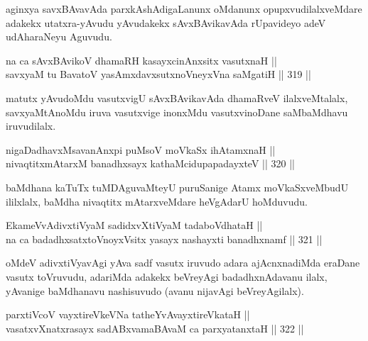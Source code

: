 \begin{artha}
aginxya savxBAvavAda parxkAshAdigaLanunx oMdanunx
opupxvudilalxveMdare adakekx utatxra-yAvudu yAvudakekx sAvxBAvikavAda
rUpavideyo adeV udAharaNeyu Aguvudu.
\end{artha}

\begin{shl}
na ca sAvxBAvikoV dhamaRH kasayxcinAnxsitx vasutxnaH || \\
savxyaM tu BavatoV yasAmxdavxsutxnoV\s neyxVna saMgatiH \hfill || 319 ||  
\end{shl}

\begin{artha}
matutx yAvudoMdu vasutxvigU sAvxBAvikavAda dhamaRveV ilalxveMtalalx,
savxyaMtAnoMdu iruva vasutxvige inonxMdu vasutxvinoDane saMbaMdhavu
iruvudilalx.
\end{artha}

\begin{shl}
nigaDadhavxMsavanAnxpi puMsoV moVkaSx ihA\s \s tamxnaH ||  \\
nivaqtitxmAtarxM banadhxsayx kathaMcidupapadayxteV \hfill || 320 ||  
\end{shl}

\begin{artha}
baMdhana kaTuTx tuMDAguvaMteyU puruSanige Atamx moVkaSxveMbudU
ililxlalx, baMdha nivaqtitx mAtarxveMdare heVgAdarU hoMduvudu.
\end{artha}

\begin{shl}
EkameVvAdivxtiVyaM sadidxvXtiVyaM tadaboVdhataH || \\
na ca badadhxsatxtoV\s noyxV\s sitx yasayx nashayxti banadhxnamf \hfill || 321 ||  
\end{shl}

\begin{artha}
oMdeV adivxtiVyavAgi yAva sadf vasutx iruvudo adara ajAcnxnadiMda
eraDane vasutx toVruvudu, adariMda adakekx beVreyAgi badadhxnAdavanu
ilalx, yAvanige baMdhanavu nashisuvudo (avanu nijavAgi beVreyAgilalx).
\end{artha}


\begin{shl}
parxtiVcoV vayxtireVkeVNa tatheYvAvayxtireVkataH || \\
vasatxvXnatxrasayx sadABxvamaBAvaM ca parxyatanxtaH \hfill || 322 ||  
\end{shl}

